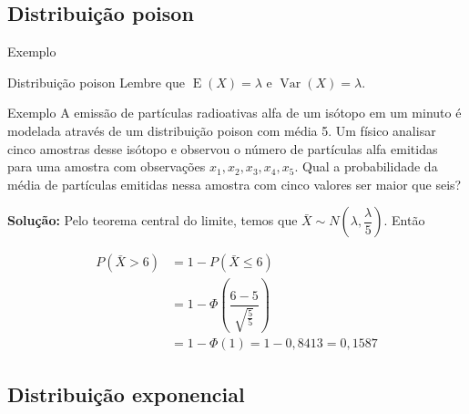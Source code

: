 \documentclass[9pt]{beamer}
\DeclareMathOperator{\espe}{E}
\DeclareMathOperator{\vari}{Var}
\begin{document}
\subsection{Distribuição poison}

\begin{frame}{Exemplo}

\begin{block}{Distribuição poison}
Lembre que $\espe(X) = \lambda$ e $\vari(X) = \lambda$.
\end{block}


\begin{block}{Exemplo}
 A emissão de partículas radioativas alfa de um isótopo em um minuto é modelada através de um distribuição poison com média 5. 
 Um físico analisar cinco amostras desse isótopo e observou o número de partículas alfa emitidas para  uma amostra com observações $x_1, x_2, x_3, x_4, x_5$. 
 Qual a probabilidade da média de partículas emitidas nessa amostra com cinco valores ser maior que seis?
 \vfill
 
 \textbf{Solução:} Pelo teorema central do limite, temos que $\bar{X} \sim N\left(\lambda, \dfrac{\lambda}{5}\right)$. Então
 
 \begin{align*}
  P(\bar{X} > 6) &= 1 - P(\bar{X} \leq 6)\\
  &= 1 - \Phi\left( \dfrac{6-5}{\sqrt{ \frac{5}{5} }} \right)\\
  &= 1 - \Phi( 1) = 1 - 0,8413 = 0,1587
 \end{align*}

\end{block}
\end{frame}

\subsection{Distribuição exponencial}
\end{document}
